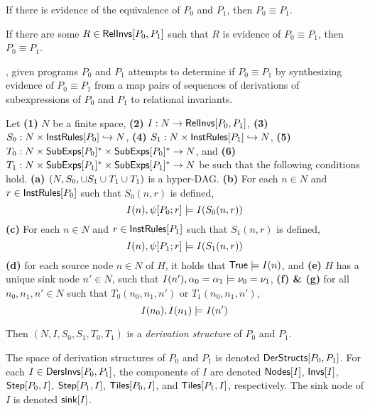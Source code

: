 If there is evidence of the equivalence of $P_0$ and $P_1$, then $P_0
\equiv P_1$.
%
\begin{lemma}
  \label{lemma:equiv-evidence}
  If there are some $R \in \mathsf{RelInvs}[ P_0, P_1 ]$ such that $R$ is
  evidence of $P_0 \equiv P_1$, then $P_0 \equiv P_1$.
\end{lemma}

\sys, given programs $P_0$ and $P_1$ attempts to determine if $P_0
\equiv P_1$ by synthesizing evidence of $P_0 \equiv P_1$ from a map
pairs of sequences of derivations of subexpressions of $P_0$ and $P_1$
to relational invariants.
%
\begin{defn}
  \label{defn:der-structs}
  Let \textbf{(1)} $N$ be a finite space, %
  \textbf{(2)} $I: N \to \mathsf{RelInvs}[ P_0, P_1 ]$,
  \textbf{(3)} $S_0 : N \times \mathsf{InstRules}[ P_0 ] \hookrightarrow N$, %
  \textbf{(4)} $S_1 : N \times \mathsf{InstRules}[ P_1 ] \hookrightarrow N$, %
  \textbf{(5)} $T_0 : N \times \mathsf{SubExps}[ P_0 ]^{*} \times
  \mathsf{SubExps}[ P_0 ]^{*} \to N$, and
  \textbf{(6)} $T_1 : N \times \mathsf{SubExps}[ P_1 ]^{*} \times
  \mathsf{SubExps}[ P_1 ]^{*} \to N$ be such that the following conditions
  hold.
  \textbf{(a)} $(N, S_0, \cup S_1 \cup T_1 \cup T_1)$ is a
  hyper-DAG.
  \textbf{(b)} For each $n \in N$ and $r \in \mathsf{InstRules}[ P_0 ]$ such
  that $S_0(n, r)$ is defined,
  \[ I(n), \psi[  P_0  ;  r  ] \models I(S_0(n, r))
  \]
  \textbf{(c)} For each $n \in N$ and $r \in \mathsf{InstRules}[ P_1 ]$ such
  that $S_1(n, r)$ is defined,
  \[ I(n), \psi[  P_1  ;  r  ] \models I(S_1(n, r))
  \]
  \textbf{(d)} for each source node $n \in N$ of $H$, it holds that
  $\mathsf{True} \models I(n)$, and
  \textbf{(e)} $H$ has a unique sink node $n' \in N$, such that $I(n'),
  \alpha_0 = \alpha_1 \models \nu_0 = \nu_1$, %
  \textbf{(f) \& (g)} for all $n_0, n_1, n' \in N$ such that $T_0(n_0,
  n_1, n')$ or $T_1(n_0, n_1, n')$,
  \[ I(n_0), I(n_1) \models I(n')
  \]

  Then $(N, I, S_0, S_1, T_0, T_1)$ is a \emph{derivation structure}
  of $P_0$ and $P_1$.
\end{defn}
%
The space of derivation structures of $P_0$ and $P_1$ is denoted
$\mathsf{DerStructs}[ P_0, P_1 ]$.
%
For each $I \in \mathsf{DersInvs}[ P_0, P_1 ]$, the components of $I$ are
denoted $\mathsf{Nodes}[ I ]$, $\mathsf{Invs}[ I ]$, $\mathsf{Step}[ P_0, I ]$,
$\mathsf{Step}[ P_1, I ]$, $\mathsf{Tiles}[ P_0, I ]$, and $\mathsf{Tiles}[ P_1, I ]$,
respectively.
%
The sink node of $I$ is denoted $\mathsf{sink}[ I ]$.

